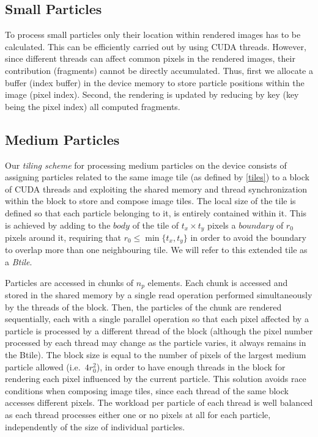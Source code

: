 \documentclass[smallextended]{svjour3}
\begin{document}
\subsection{Small Particles}
\label{sec:smallparticles}
To process small particles only their location within rendered images has to be calculated. This can be efficiently carried out by using CUDA threads. However, since different threads can affect common pixels in the rendered images, their contribution (fragments) cannot be directly accumulated. Thus, first we allocate a buffer (index buffer) in the device memory to store particle positions within the image (pixel index). Second, the rendering is updated by reducing by key (key being the pixel index) all computed fragments.

\subsection{Medium Particles}
\label{sec:mediumparticles}
Our \textit{tiling scheme} for processing medium particles on the device consists of assigning particles related to the same image tile (as defined by \eqref{tiles}) to a block of CUDA threads and exploiting the shared memory and thread synchronization within the block to store and compose image tiles. The local size of the tile is defined so that each particle belonging to it, is entirely contained within it. This is achieved by adding to the $body$ of the tile of $t_x \times t_y$ pixels a $boundary$ of $r_0$ pixels around it, requiring that $r_0 \le \min\{t_x, t_y\}$ in order to avoid the boundary to overlap more than one neighbouring tile. We will refer to this extended tile as a \textit{Btile}.

Particles are accessed in chunks of $n_p$ elements. Each chunk is accessed and stored in the shared memory by a single read operation performed simultaneously by the threads of the block. Then, the particles of the chunk are rendered sequentially, each with a single parallel operation so that each pixel affected by a particle is processed by a different thread of the block (although the pixel number processed by each thread may change as the particle varies, it always remains in the Btile). The block size is equal to the number of pixels of the largest medium particle allowed (i.e.~$4r_0^2$), in order to have enough threads in the block for rendering each pixel influenced by the current particle. 
This solution avoids race conditions when composing image tiles, since each
thread of the same block accesses different pixels. The workload per particle of each
thread is well balanced as each thread processes either one or no pixels at all for each particle, independently of the size of individual particles.
\end{document}
